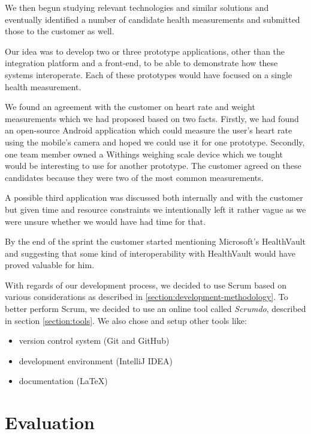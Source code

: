 We then begun studying relevant technologies and similar solutions and eventually identified
a number of candidate health measurements and submitted those to the customer as well.

Our idea was to develop two or three prototype applications, other than the integration
platform and a front-end, to be able to demonstrate how these systems interoperate.
Each of these prototypes would have focused on a single health measurement.

We found an agreement with the customer on heart rate and weight measurements which we had
proposed based on two facts. Firstly, we had found an open-source Android application which could
measure the user's heart rate using the mobile's camera and hoped we could use it for one prototype.
Secondly, one team member owned a Withings weighing scale device which we tought
would be interesting to use for another prototype.
The customer agreed on these candidates because they were two of the most common measurements.

A possible third application was discussed both internally and with the customer but
given time and resource constraints we intentionally left it rather vague
as we were unsure whether we would have had time for that.

By the end of the sprint the customer started mentioning Microsoft's HealthVault and suggesting
that some kind of interoperability with HealthVault would have proved valuable for him.

With regards of our development process, we decided to use Scrum based on various considerations as
described in \ref{section:development-methodology}. To better perform Scrum, we decided
to use an online tool called \textit{Scrumdo}, described in section \ref{section:tools}.
We also chose and setup other tools like:
\begin{itemize}
\item version control system (Git and GitHub)
\item development environment (IntelliJ IDEA)
\item documentation (LaTeX)
\end{itemize}

\section{Evaluation}

